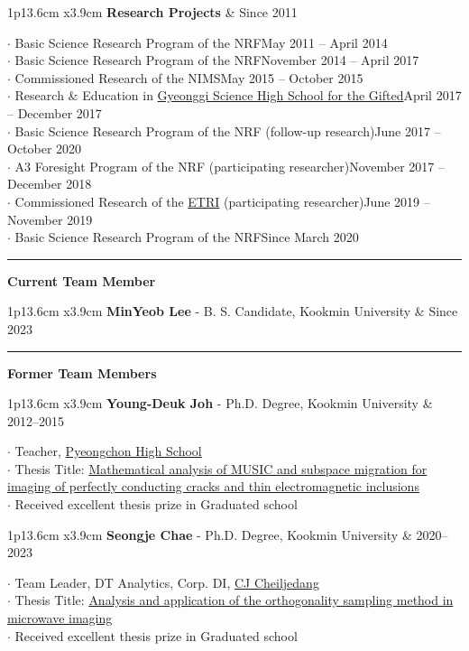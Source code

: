 \documentclass[10pt,A4]{article}
\newcommand{\cvsection}[1]
{
	\begin{center}
		\large\textcolor{sectcol}{\textbf{#1}}
	\end{center}
}
\newcommand{\cveventthree}[3]
{

\begin{tabular*}{1\textwidth}{p{13.6cm}  x{3.9cm}}
	\textbf{#2} - \textcolor{bgcol}{#3} &   \vspace{2.5pt}\textcolor{sectcol}{#1}
\end{tabular*}

}
\newcommand{\cveventsix}[6]
{

\begin{tabular*}{1\textwidth}{p{13.6cm}  x{3.9cm}}
	\textbf{#2} - \textcolor{bgcol}{#3} &   \vspace{2.5pt}\textcolor{sectcol}{#1}
\end{tabular*}


  $\cdot$ #4\\[3pt]
  $\cdot$ #5\\[3pt]
  $\cdot$ #6\\[6pt]

}
\begin{document}
\begin{tabular*}{1\textwidth}{p{13.6cm}  x{3.9cm}}
	\textbf{Research Projects} &   \vspace{2.5pt}\textcolor{sectcol}{Since 2011}
\end{tabular*}


  $\cdot$ Basic Science Research Program of the NRF\hfill May 2011 -- April 2014\\[3pt]
  $\cdot$ Basic Science Research Program of the NRF\hfill November 2014 -- April 2017\\[3pt]
  $\cdot$ Commissioned Research of the NIMS\hfill May 2015 -- October 2015\\[3pt]
  $\cdot$ Research \& Education in \href{https://www.gs.hs.kr/entrance/index.do}{Gyeonggi Science High School for the Gifted}\hfill April 2017 -- December 2017\\[3pt]
  $\cdot$ Basic Science Research Program of the NRF (follow-up research)\hfill June 2017 -- October 2020\\[3pt]
  $\cdot$ A3 Foresight Program of the NRF (participating researcher)\hfill November 2017 -- December 2018\\[3pt]
  $\cdot$ Commissioned Research of the \href{https://www.etri.re.kr/intro.html}{ETRI} (participating researcher)\hfill June 2019 -- November 2019\\[3pt]
  $\cdot$ Basic Science Research Program of the NRF\hfill Since March 2020
  
\textcolor{softcol}{\hrule}

\cvsection{Current Team Member}
\cveventthree{Since 2023}{MinYeob Lee}{B. S. Candidate, Kookmin University}

\textcolor{softcol}{\hrule}

\cvsection{Former Team Members}
\cveventsix{2012--2015}{Young-Deuk Joh}{Ph.D. Degree, Kookmin University}
{Teacher, \href{https://pyeongchon.hs.kr}{Pyeongchon High School}}{Thesis Title: \href{http://www.riss.kr/link?id=T13683375}{Mathematical analysis of MUSIC and subspace migration for imaging of perfectly conducting cracks and thin electromagnetic inclusions}}{Received excellent thesis prize in Graduated school}  

\cveventsix{2020--2023}{Seongje Chae}{Ph.D. Degree, Kookmin University}
{Team Leader, DT Analytics, Corp. DI, \href{https://www.cj.co.kr/kr/index}{CJ Cheiljedang}}{Thesis Title: \href{http://www.riss.kr/link?id=T16631991}{Analysis and application of the orthogonality sampling method in microwave imaging}}{Received excellent thesis prize in Graduated school}
\end{document}
